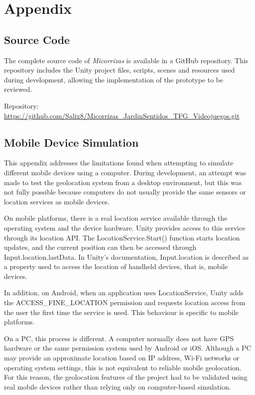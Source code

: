 \chapter{Appendix}

\section{Source Code}
The complete source code of \textit{Micorrizas} is available in a GitHub repository. This repository includes the Unity project files, scripts, scenes and resources used during development, allowing the implementation of the prototype to be reviewed.

Repository: \url{https://github.com/Salix8/Micorrizas_JardinSentidos_TFG_Videojuegos.git}

\section{Mobile Device Simulation}
This appendix addresses the limitations found when attempting to simulate different mobile devices using a computer. During development, an attempt was made to test the geolocation system from a desktop environment, but this was not fully possible because computers do not usually provide the same sensors or location services as mobile devices.

On mobile platforms, there is a real location service available through the operating system and the device hardware. Unity provides access to this service through its location API. The LocationService.Start() function starts location updates, and the current position can then be accessed through Input.location.lastData. In Unity’s documentation, Input.location is described as a property used to access the location of handheld devices, that is, mobile devices.

In addition, on Android, when an application uses LocationService, Unity adds the ACCESS\_FINE\_LOCATION permission and requests location access from the user the first time the service is used. This behaviour is specific to mobile platforms.

On a PC, this process is different. A computer normally does not have GPS hardware or the same permission system used by Android or iOS. Although a PC may provide an approximate location based on IP address, Wi-Fi networks or operating system settings, this is not equivalent to reliable mobile geolocation. For this reason, the geolocation features of the project had to be validated using real mobile devices rather than relying only on computer-based simulation.

